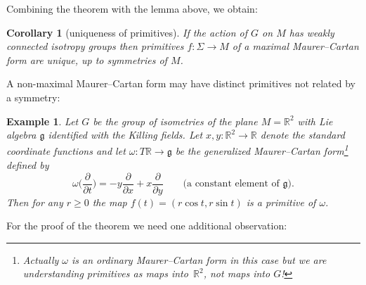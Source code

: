\documentclass[10pt,a4paper]{amsart}
\numberwithin{equation}{section}
\newtheorem{Corollary}[Theorem]{Corollary}
\newtheorem{Example}[Theorem]{Example}
\renewcommand{\ge}{\geqslant}
\begin{document}
Combining the theorem with the lemma above, we obtain:
\begin{Corollary}[uniqueness of primitives]\label{uniquenessC}
 If the action of $G$ on $M$ has weakly connected isotropy groups
 then primitives $f \colon \Sigma \rightarrow M$ of a maximal
 Maurer--Cartan form are unique, up to symmetries of $M$.
\end{Corollary}

A non-maximal Maurer--Cartan form may have distinct primitives not
related by a symmetry:
\begin{Example} Let $G$ be the group of isometries of the plane
$M={\mathbb R}^2 $ with Lie algebra ${\mathfrak g} $ identified with
the Killing fields. Let $x, y \colon {\mathbb R}^2 \rightarrow
{\mathbb R} $ denote the standard coordinate functions and let $
\omega \colon T {\mathbb R} \rightarrow {\mathfrak g} $ be the
generalized Maurer--Cartan form\footnote{Actually $\omega $ is an
ordinary Maurer--Cartan form in this case but we are understanding
primitives as maps into~${\mathbb R}^2$, not maps into $G$!} defined
by
\begin{equation*}
\omega \bigg( \frac{\partial }{\partial t}\bigg)=
-y\frac{\partial }{\partial x }+x \frac{\partial }{\partial y}
\qquad\text{(a constant element of $\mathfrak g$).}
 \end{equation*}
 Then for any $r\ge 0$ the map $f (t)=(r\cos t, r\sin
t)$ is a primitive of $\omega $.
\end{Example}

For the proof of the theorem we need one additional observation:
\end{document}
